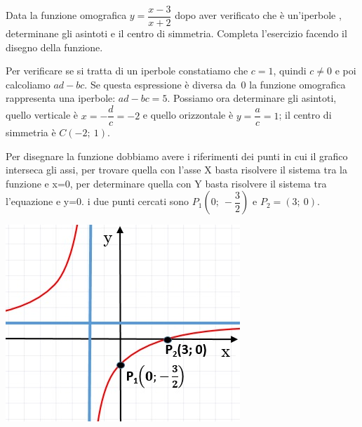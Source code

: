 \begin{esempio} Data la funzione omografica $y= \dfrac{x-3}{x+2}$ 
dopo aver verificato che è un'iperbole , determinane gli 
asintoti e il centro di simmetria. Completa l'esercizio facendo il disegno 
della funzione.

Per verificare se si tratta di un iperbole constatiamo che 
$c=1$, quindi $c \neq 0$ e poi calcoliamo $ad-bc$. Se questa espressione è 
diversa da~0 la funzione omografica rappresenta una iperbole: $ad-bc=5$. 
Possiamo ora determinare gli asintoti, quello verticale è 
$x=- \dfrac{d}{c} =-2$ e quello orizzontale è $y= \dfrac{a}{c} =1$; 
il centro di simmetria è $C(-2; ~1)$.

  \begin{minipage}[c]{.65\textwidth}
     Per disegnare la funzione dobbiamo avere i riferimenti dei 
punti in cui il grafico interseca gli assi, per trovare quella con l'asse X 
basta risolvere il sistema tra la funzione e x=0, per determinare quella 
con Y basta risolvere il sistema tra l'equazione e y=0. i due punti cercati 
sono $ P_{1}  \left(0;~ - \dfrac{3}{2} \right)$ e $ P_{2} =(3;~0)$.
  \end{minipage}
  \hfill
  \begin{minipage}[c]{.25\textwidth}
    \includegraphics[width=\textwidth]{img/equilatera2b.jpg}
  \end{minipage}
\end{esempio}


  


